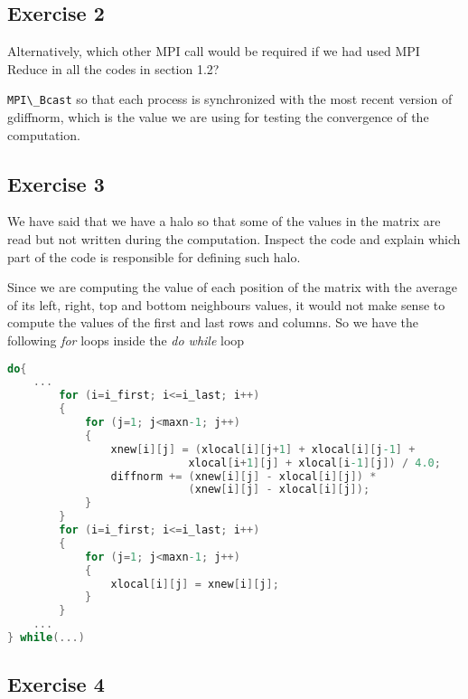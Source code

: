 \documentclass{article}
\newcommand{\incode}[1]{\lstinline[style=c,language=C]{#1}}
\begin{document}
    \subsection{Exercise 2}

    \begin{mdframed}
    Alternatively, which other MPI call would be required if we had used MPI
    Reduce in all the codes in section 1.2?
    \end{mdframed}

    \incode{MPI\_Bcast} so that each process is synchronized with the most
    recent version of gdiffnorm, which is the value we are using for testing
    the convergence of the computation.


    \subsection{Exercise 3}

    \begin{mdframed}
    We have said that we have a halo so that some of the values in the matrix
    are read but not written during the computation. Inspect the code and
    explain which part of the code is responsible for defining such halo.
    \end{mdframed}

    Since we are computing the value of each position of the matrix with the
    average of its left, right, top and bottom neighbours values, it would not
    make sense to compute the values of the first and last rows and columns. So
    we have the following \textit{for} loops inside the \textit{do while} loop

    \begin{lstlisting}[style=c, language=C]
do{
    ...
        for (i=i_first; i<=i_last; i++)
        {
            for (j=1; j<maxn-1; j++) 
            {
                xnew[i][j] = (xlocal[i][j+1] + xlocal[i][j-1] +
                            xlocal[i+1][j] + xlocal[i-1][j]) / 4.0;
                diffnorm += (xnew[i][j] - xlocal[i][j]) *
                            (xnew[i][j] - xlocal[i][j]);
            }
        }
        for (i=i_first; i<=i_last; i++)
        {
            for (j=1; j<maxn-1; j++)
            {
                xlocal[i][j] = xnew[i][j];
            }
        }
    ...
} while(...)
    \end{lstlisting}

    \subsection{Exercise 4}
\end{document}
